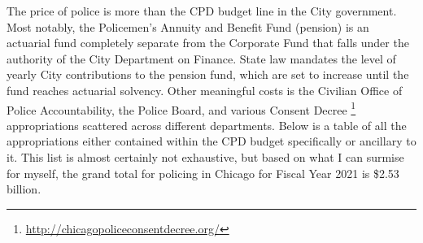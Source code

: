 \documentclass[
]{article}
\begin{document}
The price of police is more than the CPD budget line in the City
government. Most notably, the Policemen's Annuity and Benefit Fund
(pension) is an actuarial fund completely separate from the Corporate
Fund that falls under the authority of the City Department on Finance.
State law mandates the level of yearly City contributions to the pension
fund, which are set to increase until the fund reaches actuarial
solvency. Other meaningful costs is the Civilian Office of Police
Accountability, the Police Board, and various Consent Decree \footnote{\url{http://chicagopoliceconsentdecree.org/}}
appropriations scattered across different departments. Below is a table
of all the appropriations either contained within the CPD budget
specifically or ancillary to it. This list is almost certainly not
exhaustive, but based on what I can surmise for myself, the grand total
for policing in Chicago for Fiscal Year 2021 is \$2.53 billion.
\end{document}
